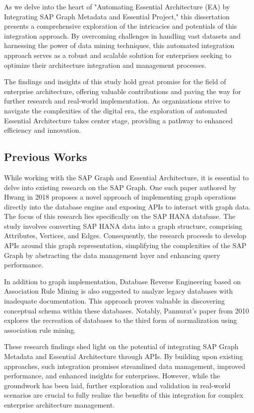 \documentclass{article}
\begin{document}
As we delve into the heart of "Automating Essential Architecture (EA) by Integrating SAP Graph Metadata and Essential Project," this dissertation presents a comprehensive exploration of the intricacies and potentials of this integration approach. By overcoming challenges in handling vast datasets and harnessing the power of data mining techniques, this automated integration approach serves as a robust and scalable solution for enterprises seeking to optimize their architecture integration and management processes.

The findings and insights of this study hold great promise for the field of enterprise architecture, offering valuable contributions and paving the way for further research and real-world implementation. As organizations strive to navigate the complexities of the digital era, the exploration of automated Essential Architecture takes center stage, providing a pathway to enhanced efficiency and innovation.

\maketitle
\subsection{Previous Works}
While working with the SAP Graph and Essential Architecture, it is essential to delve into existing research on the SAP Graph. One such paper authored by Hwang in 2018 proposes a novel approach of implementing graph operations directly into the database engine and exposing APIs to interact with graph data. The focus of this research lies specifically on the SAP HANA database. The study involves converting SAP HANA data into a graph structure, comprising Attributes, Vertices, and Edges. Consequently, the research proceeds to develop APIs around this graph representation, simplifying the complexities of the SAP Graph by abstracting the data management layer and enhancing query performance. \parencite{hwang2018}

In addition to graph implementation, Database Reverse Engineering based on Association Rule Mining is also suggested to analyze legacy databases with inadequate documentation. This approach proves valuable in discovering conceptual schema within these databases. Notably, Pannurat's paper from 2010 \parencite{pannurat2010} explores the recreation of databases to the third form of normalization using association rule mining.

These research findings shed light on the potential of integrating SAP Graph Metadata and Essential Architecture through APIs. By building upon existing approaches, such integration promises streamlined data management, improved performance, and enhanced insights for enterprises. However, while the groundwork has been laid, further exploration and validation in real-world scenarios are crucial to fully realize the benefits of this integration for complex enterprise architecture management.
\end{document}

